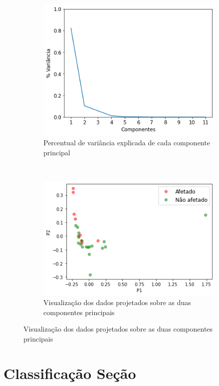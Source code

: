 \begin{figure}[htb] 
    \centering 
    \caption{PCA sobre dados totais de UFs}
    \label{fig:resultados:base-de-dados-25-pca-2d-total-uf} 
    \begin{subfigure}[b]{0.45\textwidth}
        \includegraphics[scale=0.45]{images/base-de-dados-25.1-pca-components-total-uf.png}
        \caption{Percentual de variância explicada de cada componente principal}
        \label{fig:resultados:base-de-dados-25.1-pca-components-total-uf}
    \end{subfigure} ~ \quad
    \begin{subfigure}[b]{0.45\textwidth}
        \includegraphics[scale=0.45]{images/base-de-dados-25.2-pca-2d-total-uf.png}
        \caption{Visualização dos dados projetados sobre as duas componentes principais}
        \label{fig:resultados:base-de-dados-25.2-pca-2d-total-uf}
    \end{subfigure}
    \fdadospesquisa
\end{figure}

\section{Classificação Seção}


